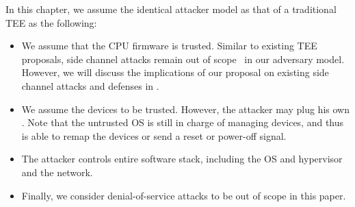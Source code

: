 In this chapter, we assume the identical attacker model as that of a traditional TEE as the following:

\begin{itemize}
  \item We assume that the CPU firmware is trusted. Similar to existing TEE proposals, side channel attacks remain out of scope~\cite{costan2016intel} in our adversary model. However, we will discuss the implications of our proposal on existing side channel attacks and defenses in . 
  
  \item We assume the \sphw devices to be trusted. However, the attacker may plug his own \sphw. Note that the untrusted OS is still in charge of managing \sphw devices, and thus is able to remap the devices or send a reset or power-off signal.
  
  \item  The attacker controls entire software stack, including the OS and hypervisor and the network.
   
  \item Finally, we consider denial-of-service attacks to be out of scope in this paper. 
\end{itemize}




